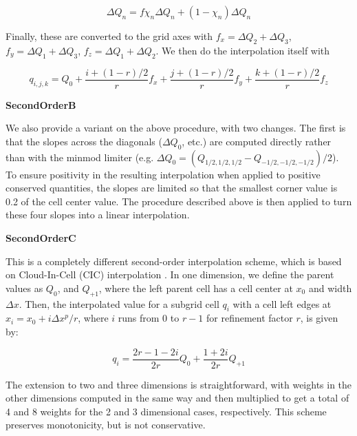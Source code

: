 \begin{equation}
\Delta Q_n = f \chi_n \Delta Q_n + (1-\chi_n) \Delta Q_n
\end{equation}

Finally, these are converted to the grid axes with $f_x = \Delta Q_2 +
\Delta Q_3$, $f_y = \Delta Q_1 + \Delta Q_3$, $f_z = \Delta Q_1 +
\Delta Q_2$.  We then do the interpolation itself with

\begin{equation}
q_{i,j,k} = Q_0 + \frac{i+(1-r)/2}{r} f_x + \frac{j+(1-r)/2}{r} f_y + \frac{k+(1-r)/2}{r} f_z
\end{equation}


\vspace{0.3cm}\noindent
{\bf SecondOrderB} 

We also provide a variant on the above procedure, with two changes.
The first is that the slopes across the diagonals ($\Delta Q_0$, etc.)
are computed directly rather than with the minmod limiter
(e.g. $\Delta Q_0 = (Q_{1/2,1/2,1/2} - Q_{-1/2,-1/2,-1/2})/2$).  To
ensure positivity in the resulting interpolation when applied to
positive conserved quantities, the slopes are limited so that the
smallest corner value is 0.2 of the cell center value.  The procedure
described above is then applied to turn these four slopes into a
linear interpolation.


\vspace{0.3cm}\noindent
{\bf SecondOrderC} 

This is a completely different second-order interpolation scheme,
which is based on Cloud-In-Cell (CIC) interpolation \citep{Hockney88}.
In one dimension, we define the parent values as $Q_0$, and $Q_{+1}$,
where the left parent cell has a cell center at $x_0$ and width
$\Delta x$.  Then, the interpolated value for a subgrid cell $q_i$
with a cell left edges at $x_i = x_0 + i \Delta x^p/r$, where $i$ runs
from 0 to $r-1$ for refinement factor $r$, is given by:

\begin{equation}
q_i =  \frac{2r - 1 - 2i}{2r} Q_0 + \frac{1+2i}{2r} Q_{+1}
\end{equation}

The extension to two and three dimensions is straightforward, with
weights in the other dimensions computed in the same way and then
multiplied to get a total of 4 and 8 weights for the 2 and 3
dimensional cases, respectively.  This scheme preserves monotonicity,
but is not conservative.

